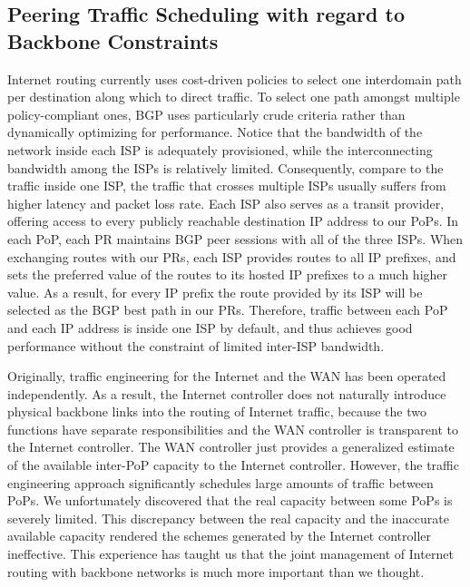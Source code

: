 

\subsection{Peering Traffic Scheduling with regard to Backbone Constraints}
Internet routing currently uses cost-driven policies to select one interdomain path per destination along which to direct traffic. To select one path amongst multiple policy-compliant ones, BGP uses particularly crude criteria rather than dynamically optimizing for performance. Notice that the bandwidth of the network inside each ISP is adequately provisioned, while the interconnecting bandwidth among the ISPs is relatively limited. Consequently, compare to the traffic inside one ISP, the traffic that crosses multiple ISPs usually suffers from higher latency and packet loss rate. Each ISP also serves as a transit provider, offering access to every publicly reachable destination IP address to our PoPs. In each PoP, each PR maintains BGP peer sessions with all of the three ISPs. When exchanging routes with our PRs, each ISP provides routes to all IP prefixes, and sets the preferred value of the routes to its hosted IP prefixes to a much higher value. As a result, for every IP prefix the route provided by its ISP will be selected as the BGP best path in our PRs. Therefore, traffic between each PoP and each IP address is inside one ISP by default, and thus achieves good performance without the constraint of limited inter-ISP bandwidth. 


 Originally, traffic engineering for the Internet and the WAN has been operated independently. As a result, the Internet controller does not naturally introduce physical backbone links into the routing of Internet traffic, because the two functions have separate responsibilities and the WAN controller is transparent to the Internet controller. The WAN controller just provides a generalized estimate of the available inter-PoP capacity to the Internet controller. However, the traffic engineering approach significantly schedules large amounts of traffic between PoPs. We unfortunately discovered that the real capacity between some PoPs is severely limited. This discrepancy between the real capacity and the inaccurate available capacity rendered the schemes generated by the Internet controller ineffective. This experience has taught us that the joint management of Internet routing with backbone networks is much more important than we thought.


